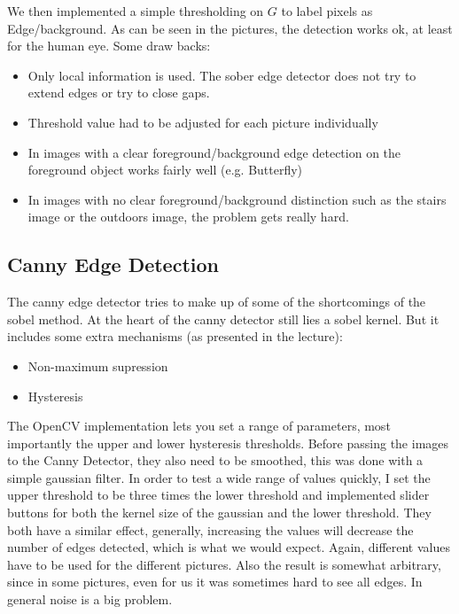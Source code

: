 \documentclass[11pt,a4paper]{article}
\begin{document}
We then implemented a simple thresholding on $G$ to label pixels as Edge/background. As can be seen in the pictures, the detection works ok, at least for the human eye. Some draw backs:
\begin{itemize}
\item Only local information is used. The sober edge detector does not try to extend edges or try to close gaps.
\item Threshold value had to be adjusted for each picture individually

\item In images with a clear foreground/background edge detection on the foreground object works fairly well (e.g. Butterfly)
\item In images with no clear foreground/background  distinction such as the stairs image or the outdoors image, the problem gets really hard.
\end{itemize}


\subsection{Canny Edge Detection}
The canny edge detector tries to make up of some of the shortcomings of the sobel method. At the heart of the canny detector still lies a sobel kernel. But it includes some extra mechanisms (as presented in the lecture):
\begin{itemize}
\item Non-maximum supression
\item Hysteresis
\end{itemize}	

The OpenCV implementation lets you set a range of parameters, most importantly the upper and lower hysteresis thresholds. Before passing the images to the Canny Detector, they also need to be smoothed, this was done with a simple gaussian filter. In order to test a wide range of values quickly, I set the upper threshold to be three times the lower threshold and implemented slider buttons for both the kernel size of the gaussian and the lower threshold. They both have a similar effect, generally, increasing the values will decrease the number of edges detected, which is what we would expect. Again, different values have to be used for the different pictures. Also the result is somewhat arbitrary, since in some pictures, even for us it was sometimes hard to see all edges. In general noise is a big problem.
\end{document}
